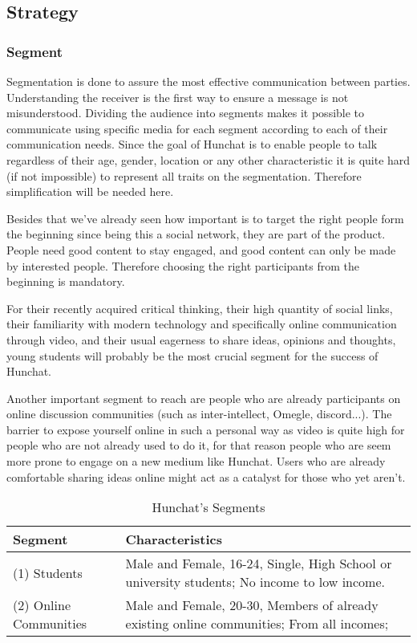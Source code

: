 \documentclass[12pt]{article}
\begin{document}
\subsection{Strategy}
\subsubsection{Segment}
Segmentation is done to assure the most effective communication between parties. Understanding the receiver is the first way to ensure a message is not misunderstood. Dividing the audience into segments makes it possible to communicate using specific media for each segment according to each of their communication needs. Since the goal of Hunchat is to enable people to talk regardless of their age, gender, location or any other characteristic it is quite hard (if not impossible) to represent all traits on the segmentation.  Therefore simplification will be needed here. 

Besides that we've already seen how important is to target the right people form the beginning since being this a social network, they are part of the product. People need good content to stay engaged, and good content can only be made by interested people. Therefore choosing the right participants from the beginning is mandatory.

For their recently acquired critical thinking, their high quantity of social links, their familiarity with modern technology and specifically online communication through video, and their usual eagerness to share ideas, opinions and thoughts, young students will probably be the most crucial segment for the success of Hunchat. 

Another important segment to reach are people who are already participants on online discussion communities (such as inter-intellect, Omegle, discord...). The barrier to expose yourself online in such a personal way as video is quite high for people who are not already used to do it, for that reason people who are seem more prone to engage on a new medium like Hunchat. Users who are already comfortable sharing ideas online might act as a catalyst for those who yet aren't. 

\begin{table}[htbp]
\small
\caption{Hunchat's Segments}
\label{table:seg}
\centering
\begin{tabular}{ @{}P{0.2\textwidth}P{0.7\textwidth}@{} }
Segment	&	Characteristics	\\ \hline
(1) Students	&	Male and Female, 16-24, Single, High School or university students; No income to low income. \\
(2) Online Communities	& Male and Female, 20-30, Members of already existing online communities; From all incomes;
 \\ \hline
\end{tabular}
\end{table}
\end{document}
